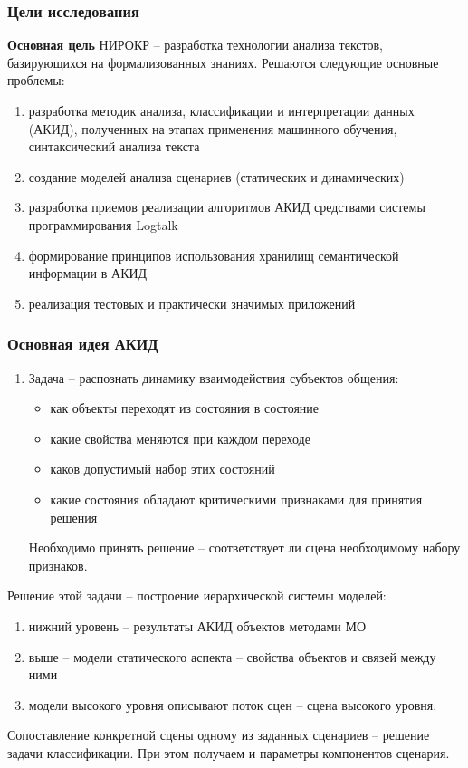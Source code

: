 \documentclass[10pt]{beamer}
\begin{document}
\begin{frame}
  \frametitle{Цели исследования}
  \textbf{Основная цель} НИРОКР -- разработка технологии анализа текстов, базирующихся на формализованных знаниях. Решаются следующие основные проблемы:
  \begin{enumerate}
  \item разработка методик анализа, классификации и интерпретации данных (АКИД), полученных на этапах применения машинного обучения, синтаксический анализа текста
  \item создание моделей анализа сценариев (статических и динамических) %
  \item разработка приемов реализации алгоритмов АКИД средствами системы программирования Logtalk
  \item формирование принципов использования хранилищ семантической информации в АКИД
  \item реализация тестовых и практически значимых приложений
  \end{enumerate}
\end{frame}
\begin{frame}
  \frametitle{Основная идея АКИД}
  \begin{enumerate}
  \item Задача -- распознать динамику взаимодействия субъектов общения:
    \begin{itemize}
    \item как объекты переходят из состояния в состояние
    \item какие свойства меняются при каждом переходе
    \item каков допустимый набор этих состояний
    \item какие состояния обладают критическими признаками для принятия решения
    \end{itemize}
   Необходимо принять решение -- соответствует ли сцена необходимому набору признаков.
  \end{enumerate}

  Решение этой задачи -- построение иерархической системы моделей:
  \begin{enumerate}
  \item нижний уровень -- результаты АКИД объектов методами МО
  \item выше -- модели статического аспекта -- свойства объектов и связей между ними
  \item модели высокого уровня описывают поток сцен -- сцена высокого уровня.
  \end{enumerate}

Сопоставление конкретной сцены одному из заданных сценариев -- решение задачи классификации. При этом получаем и параметры компонентов сценария.
\end{frame}
\end{document}

